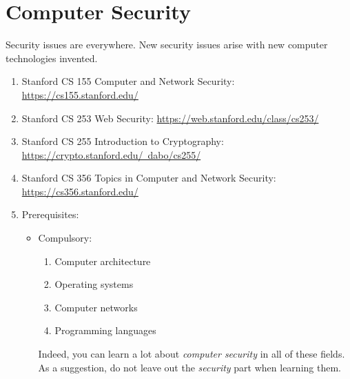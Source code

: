 \documentclass{article}
\begin{document}
\section{Computer Security}
Security issues are everywhere.
New security issues arise with new computer technologies invented.
\begin{enumerate}
    \item Stanford CS 155 Computer and Network Security:
    \href{https://cs155.stanford.edu/}{https://cs155.stanford.edu/}
    \item Stanford CS 253 Web Security:
    \href{https://web.stanford.edu/class/cs253/}{https://web.stanford.edu/class/cs253/}
    \item Stanford CS 255 Introduction to Cryptography:
    \href{https://crypto.stanford.edu/~dabo/cs255/}{https://crypto.stanford.edu/~dabo/cs255/}
    \item Stanford CS 356 Topics in Computer and Network Security:
    \href{https://cs356.stanford.edu/}{https://cs356.stanford.edu/}
    \item Prerequisites:
    \begin{itemize}
        \item Compulsory:
        \begin{enumerate}
            \item Computer architecture
            \item Operating systems
            \item Computer networks
            \item Programming languages
        \end{enumerate}
        Indeed, you can learn a lot about \emph{computer security} in all of these fields.
        As a suggestion, do not leave out the \emph{security} part when learning them.
    \end{itemize}
\end{enumerate}
\end{document}
